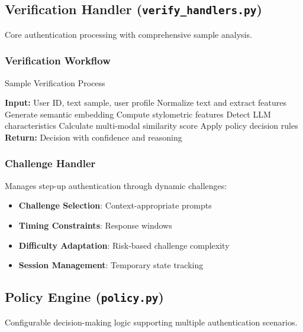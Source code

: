 \documentclass[12pt,a4paper]{article}
\begin{document}
\subsection{Verification Handler (\texttt{verify\_handlers.py})}

Core authentication processing with comprehensive sample analysis.

\subsubsection{Verification Workflow}
\begin{algorithm}
\caption{Sample Verification Process}
\begin{algorithmic}
\STATE \textbf{Input:} User ID, text sample, user profile
\STATE Normalize text and extract features
\STATE Generate semantic embedding
\STATE Compute stylometric features  
\STATE Detect LLM characteristics
\STATE Calculate multi-modal similarity score
\STATE Apply policy decision rules
\STATE \textbf{Return:} Decision with confidence and reasoning
\end{algorithmic}
\end{algorithm}

\subsubsection{Challenge Handler}
Manages step-up authentication through dynamic challenges:
\begin{itemize}
    \item \textbf{Challenge Selection}: Context-appropriate prompts
    \item \textbf{Timing Constraints}: Response windows
    \item \textbf{Difficulty Adaptation}: Risk-based challenge complexity
    \item \textbf{Session Management}: Temporary state tracking
\end{itemize}

\subsection{Policy Engine (\texttt{policy.py})}

Configurable decision-making logic supporting multiple authentication scenarios.
\end{document}
